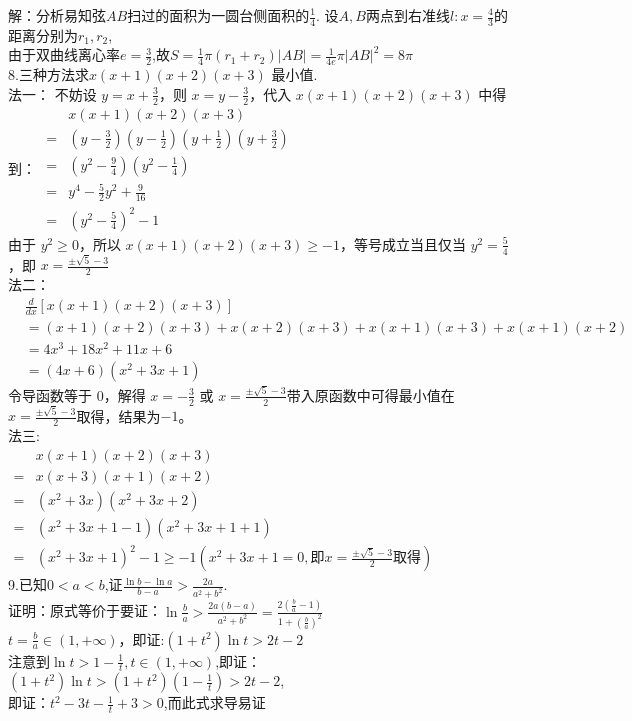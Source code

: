 \documentclass[a4paper,11pt,UTF8]{article}
\begin{document}
解：分析易知弦$AB$扫过的面积为一圆台侧面积的$\displaystyle\frac{1}{4}$.
设$A,B$两点到右准线$\displaystyle l:x=\frac{4}{3}$的距离分别为$r_1,r_2$,\\由于双曲线离心率$\displaystyle e=\frac{3}{2}$,故$\displaystyle S=\frac{1}{4}\pi(r_1+r_2)|AB|=\frac{1}{4e}\pi|AB|^2=8\pi$\\
8.$\text{三种方法求}x(x+1)(x+2)(x+3)\text{ 最小值.}$\\
法一：
不妨设 $\displaystyle y = x + \frac{3}{2}$，则 $\displaystyle x = y - \frac{3}{2}$，代入 $x(x+1)(x+2)(x+3)$ 中得到：
$\begin{aligned}
	&x(x+1)(x+2)(x+3)\\
	=& (y-\frac{3}{2})(y-\frac{1}{2})(y+\frac{1}{2})(y+\frac{3}{2}) \\
	=& (y^2 - \frac{9}{4})(y^2 - \frac{1}{4}) \\
	=& y^4 - \frac{5}{2}y^2 + \frac{9}{16}\\
	=&(y^2-\frac{5}{4})^2-1
\end{aligned}
$\\ 
由于 $y^2\geq 0$，所以 $\displaystyle x(x+1)(x+2)(x+3) \geq-1$，等号成立当且仅当 $\displaystyle y^2 = \frac{5}{4}$，即 $\displaystyle x = \frac{\pm\sqrt{5}-3}{2}$\\
法二：
\begin{align*}
	&\frac{d}{dx} [x(x+1)(x+2)(x+3)]\\
	 &= (x+1)(x+2)(x+3) + x(x+2)(x+3) + x(x+1)(x+3) + x(x+1)(x+2) \\
	&= 4x^3 + 18x^2 + 11x + 6\\
	&=(4x+6)(x^2+3x+1)
\end{align*}
令导函数等于 $0$，解得 $\displaystyle x = -\frac{3}{2}$ 或 $\displaystyle x = \frac{\pm\sqrt{5}-3}{2}$带入原函数中可得最小值在$\displaystyle x = \frac{\pm\sqrt{5}-3}{2}$取得，结果为$-1$。\\
法三:\\
$\begin{aligned}
	&x(x+1)(x+2)(x+3)\\
	=&x(x+3)(x+1)(x+2)\\
	=&(x^2+3x)(x^2+3x+2)\\
	=&(x^2+3x+1-1)(x^2+3x+1+1)\\
	=&(x^2+3x+1)^2-1\geq-1(x^2+3x+1=0,\text{即}\displaystyle x = \frac{\pm\sqrt{5}-3}{2}\text{取得})
\end{aligned}$\\
9.已知$\displaystyle0<a<b$,$\displaystyle\text{证}\frac{\ln b-\ln a}{b-a}>\frac{2a}{a^2+b^2}.$\\
证明：原式等价于要证：$\displaystyle\ln\frac{b}{a}>\frac{2a(b-a)}{a^2+b^2}=\frac{2(\frac{b}{a}-1)}{1+(\frac{b}{a})^2}$\\
$\displaystyle t=\frac{b}{a}\in(1,+\infty)$，即证:$(1+t^2)\ln t>2t-2$\\
注意到$\displaystyle\ln t >1-\frac{1}{t}, t\in(1,+\infty)$,即证：$\displaystyle(1+t^2)\ln t>(1+t^2)(1-\frac{1}{t})>2t-2$,\\
即证：$\displaystyle t^2-3t-\frac{1}{t}+3>0$,而此式求导易证
\end{document}
